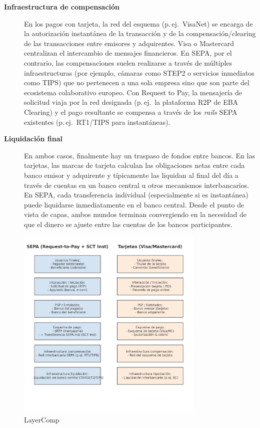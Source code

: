 \begin{description}
  \item[\textbf{Infraestructura de compensación}]
    En los pagos con tarjeta, la red del esquema (p.\,ej.\ VisaNet) se encarga de la autorización instantánea de la transacción y de la compensación/clearing de las transacciones entre emisores y adquirentes. Visa o Mastercard centralizan el intercambio de mensajes financieros. En SEPA, por el contrario, las compensaciones suelen realizarse a través de múltiples infraestructuras (por ejemplo, cámaras como STEP2 o servicios inmediatos como TIPS) que no pertenecen a una sola empresa sino que son parte del ecosistema colaborativo europeo. Con Request to Pay, la mensajería de solicitud viaja por la red designada (p.\,ej.\ la plataforma R2P de EBA Clearing) y el pago resultante se compensa a través de los \emph{rails} SEPA existentes (p.\,ej.\ RT1/TIPS para instantáneas).

  \item[\textbf{Liquidación final}]
    En ambos casos, finalmente hay un traspaso de fondos entre bancos. En las tarjetas, las marcas de tarjeta calculan las obligaciones netas entre cada banco emisor y adquirente y típicamente las liquidan al final del día a través de cuentas en un banco central u otros mecanismos interbancarios. En SEPA, cada transferencia individual (especialmente si es instantánea) puede liquidarse inmediatamente en el banco central. Desde el punto de vista de capas, ambos mundos terminan convergiendo en la necesidad de que el dinero se ajuste entre las cuentas de los bancos participantes.
\end{description}

\begin{figure}[H]
  \centering
  \includegraphics[width=0.8\textwidth]{Imagenes/LayerComp.png}
  \caption{LayerComp}
  \label{fig:4corner}
\end{figure}

